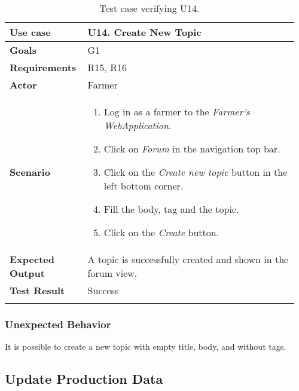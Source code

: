 \begin{longtable}{@{}p{0.25\linewidth}p{0.71\linewidth}@{}}
	\toprule
	\textbf{Use case} & \textbf{U14.} Create New Topic \\
	\midrule
	\textbf{Goals} & G1\\
	\midrule
	\textbf{Requirements} & R15, R16 \\
	\midrule
	\textbf{Actor} & Farmer\\
	\midrule
	\textbf{Scenario} & \begin{enumerate}[leftmargin=.4cm,noitemsep,topsep=0pt,before=\vspace{-3mm},after=\vspace{-4mm}]
		\item Log in as a farmer to the \textit{Farmer's WebApplication}.
		\item Click on \textit{Forum} in the navigation top bar.
		\item Click on the \textit{Create new topic} button in the left bottom corner.
		\item Fill the body, tag and the topic.
		\item Click on the \textit{Create} button.
	\end{enumerate}\\
	\midrule
	\textbf{Expected Output} & A topic is successfully created and shown in the forum view.\\
	\midrule
	\textbf{Test Result} & Success\\
	\bottomrule
	\caption{Test case verifying U14.}
\end{longtable}

\subsubsection*{Unexpected Behavior}
It is possible to create a new topic with empty title, body, and without tags.

\subsection{Update Production Data}

